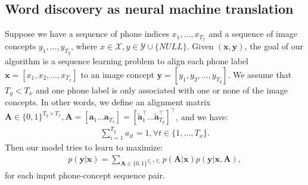 \documentclass[a4paper]{article}
\begin{document}
\subsection{Word discovery as neural machine translation}
Suppose we have a sequence of phone indices $x_1, ..., x_{T_x}$ and a sequence of image concepts $y_1, ..., y_{T_y}$, where $x \in \mathcal X, y \in \mathcal Y\cup \{NULL\}$.
Given $(\mathbf{x}, \mathbf y)$, the goal of our algorithm is a sequence learning problem to align each phone label $\mathbf{x} = [x_1, x_2, \ldots, x_{T_x}]$ to an image concept $\mathbf{y} = [y_1, y_2, \ldots, y_{T_y}]$.
We assume that $T_y < T_x$ and one phone label is only associated with one or none of the image concepts.
In other words, we define an alignment matrix $\mathbf A \in \{0, 1\}^{T_y  \times T_x}, \mathbf{A} = [\mathbf{a}_1 \ldots \mathbf{a}_{T_x}] = [\tilde{\mathbf a}_1^{\top} \ldots \tilde{\mathbf a}_{T_y}^{\top}]^\top$, and we have:
\begin{align}\label{eq:cluster_constraint}
\sum_{i=1}^{T_y} a_{it} = 1, \forall t \in \{1, \ldots, T_x\}.
\end{align}
Then our model tries to learn to maximize:
\begin{align}\label{eq:trans_prob}
    p(\mathbf{y}|\mathbf{x}) = \sum_{\mathbf{A}\in \{0, 1\}^{T_y  \times T_x}} p(\mathbf{A}|\mathbf{x}) p(\mathbf{y}|\mathbf{x}, \mathbf{A}),
\end{align}
for each input phone-concept sequence pair. 
\end{document}
